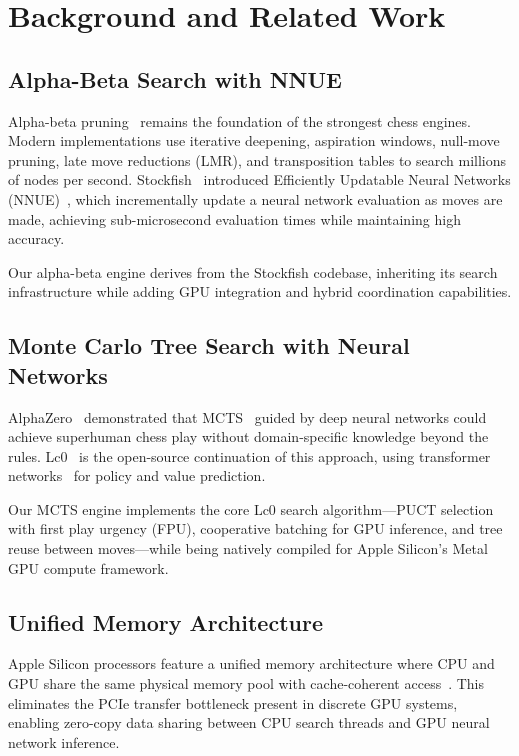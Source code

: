 \documentclass{svproc}
\begin{document}
\section{Background and Related Work}
\label{sec:background}

\subsection{Alpha-Beta Search with NNUE}
\label{sec:bg-ab}

Alpha-beta pruning~\cite{knuth1975analysis} remains the foundation of the strongest chess engines. Modern implementations use iterative deepening, aspiration windows, null-move pruning, late move reductions (LMR), and transposition tables to search millions of nodes per second. Stockfish~\cite{stockfish} introduced Efficiently Updatable Neural Networks (NNUE)~\cite{nasu2018efficiently}, which incrementally update a neural network evaluation as moves are made, achieving sub-microsecond evaluation times while maintaining high accuracy.

Our alpha-beta engine derives from the Stockfish codebase, inheriting its search infrastructure while adding GPU integration and hybrid coordination capabilities.

\subsection{Monte Carlo Tree Search with Neural Networks}
\label{sec:bg-mcts}

AlphaZero~\cite{silver2018general} demonstrated that MCTS~\cite{browne2012survey} guided by deep neural networks could achieve superhuman chess play without domain-specific knowledge beyond the rules. Lc0~\cite{lc0} is the open-source continuation of this approach, using transformer networks~\cite{vaswani2017attention} for policy and value prediction.

Our MCTS engine implements the core Lc0 search algorithm---PUCT selection~\cite{rosin2011multi} with first play urgency (FPU), cooperative batching for GPU inference, and tree reuse between moves---while being natively compiled for Apple Silicon's Metal GPU compute framework.

\subsection{Unified Memory Architecture}
\label{sec:bg-unified}

Apple Silicon processors feature a unified memory architecture where CPU and GPU share the same physical memory pool with cache-coherent access~\cite{apple2020m1}. This eliminates the PCIe transfer bottleneck present in discrete GPU systems, enabling zero-copy data sharing between CPU search threads and GPU neural network inference.
\end{document}

